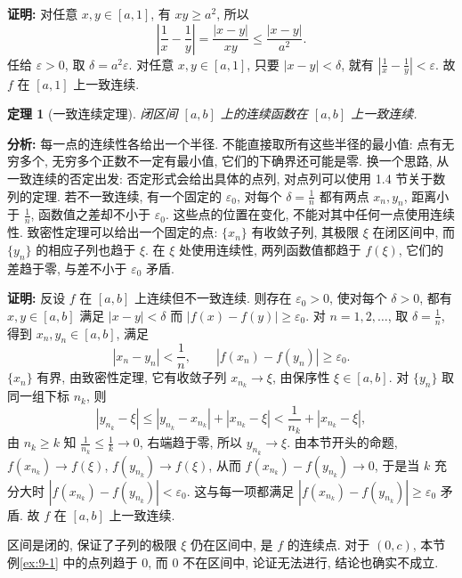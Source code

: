 \documentclass[UTF8,openany]{ctexbook}
\theoremstyle{chinesetextbook}
\newtheorem{theorem}{定理}[section]
\newenvironment{cnproof}{\par\indent\textbf{证明:} \ignorespaces}{\par}
\begin{document}
\begin{cnproof}
对任意 $x,y\in[a,1]$, 有 $xy\ge a^2$, 所以
\[
\left|\frac1x-\frac1y\right|=\frac{|x-y|}{xy}\le\frac{|x-y|}{a^2}.
\]
任给 $\varepsilon>0$, 取 $\delta=a^2\varepsilon$. 对任意 $x,y\in[a,1]$, 只要 $|x-y|<\delta$, 就有 $\displaystyle\left|\frac1x-\frac1y\right|<\varepsilon$. 故 $f$ 在 $[a,1]$ 上一致连续.
\end{cnproof}
\begin{theorem}[一致连续定理]
闭区间 $[a,b]$ 上的连续函数在 $[a,b]$ 上一致连续.
\end{theorem}
\par\indent\textbf{分析:} 每一点的连续性各给出一个半径. 不能直接取所有这些半径的最小值: 点有无穷多个, 无穷多个正数不一定有最小值, 它们的下确界还可能是零. 换一个思路, 从一致连续的否定出发: 否定形式会给出具体的点列, 对点列可以使用 1.4 节关于数列的定理. 若不一致连续, 有一个固定的 $\varepsilon_0$, 对每个 $\displaystyle\delta=\frac1n$ 都有两点 $x_n,y_n$, 距离小于 $\displaystyle\frac1n$, 函数值之差却不小于 $\varepsilon_0$. 这些点的位置在变化, 不能对其中任何一点使用连续性. 致密性定理可以给出一个固定的点: $\{x_n\}$ 有收敛子列, 其极限 $\xi$ 在闭区间中, 而 $\{y_n\}$ 的相应子列也趋于 $\xi$. 在 $\xi$ 处使用连续性, 两列函数值都趋于 $f(\xi)$, 它们的差趋于零, 与差不小于 $\varepsilon_0$ 矛盾.
\begin{cnproof}
反设 $f$ 在 $[a,b]$ 上连续但不一致连续. 则存在 $\varepsilon_0>0$, 使对每个 $\delta>0$, 都有 $x,y\in[a,b]$ 满足 $|x-y|<\delta$ 而 $|f(x)-f(y)|\ge\varepsilon_0$. 对 $n=1,2,\ldots$, 取 $\displaystyle\delta=\frac1n$, 得到 $x_n,y_n\in[a,b]$, 满足
\[
|x_n-y_n|<\frac1n,\qquad|f(x_n)-f(y_n)|\ge\varepsilon_0.
\]
$\{x_n\}$ 有界, 由致密性定理, 它有收敛子列 $x_{n_k}\to\xi$, 由保序性 $\xi\in[a,b]$. 对 $\{y_n\}$ 取同一组下标 $n_k$, 则
\[
|y_{n_k}-\xi|\le|y_{n_k}-x_{n_k}|+|x_{n_k}-\xi|<\frac1{n_k}+|x_{n_k}-\xi|,
\]
由 $n_k\ge k$ 知 $\displaystyle\frac1{n_k}\le\frac1k\to0$, 右端趋于零, 所以 $y_{n_k}\to\xi$. 由本节开头的命题, $f(x_{n_k})\to f(\xi)$, $f(y_{n_k})\to f(\xi)$, 从而 $f(x_{n_k})-f(y_{n_k})\to0$, 于是当 $k$ 充分大时 $|f(x_{n_k})-f(y_{n_k})|<\varepsilon_0$. 这与每一项都满足 $|f(x_{n_k})-f(y_{n_k})|\ge\varepsilon_0$ 矛盾. 故 $f$ 在 $[a,b]$ 上一致连续.
\end{cnproof}
区间是闭的, 保证了子列的极限 $\xi$ 仍在区间中, 是 $f$ 的连续点. 对于 $(0,c)$, 本节例\ref{ex:9-1} 中的点列趋于 $0$, 而 $0$ 不在区间中, 论证无法进行, 结论也确实不成立.
\end{document}
